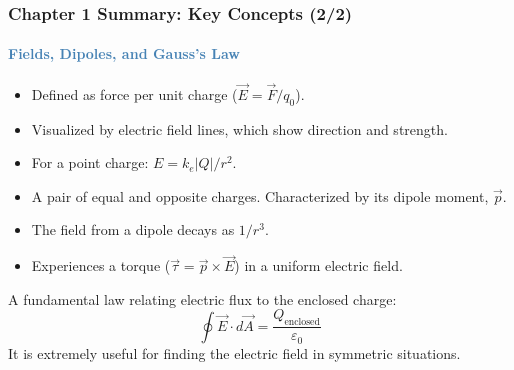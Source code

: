 \begin{frame}
\begin{frame}
\frametitle{\textsf{\textbf{Chapter 1 Summary:} Key Concepts (2/2)}}
\framesubtitle{\textcolor{steelblue}{Fields, Dipoles, and Gauss's Law}}

\begin{keybox}
\vspace{0.1cm}
\begin{itemize}
    \item Defined as force per unit charge ($\vec{E} = \vec{F}/q_0$).
    \item Visualized by electric field lines, which show direction and strength.
    \item For a point charge: $E = k_e |Q|/r^2$.
\end{itemize}
\vspace{0.1cm}
\end{keybox}

\vspace{0.3cm}

\begin{examplebox}
\vspace{0.1cm}
\begin{itemize}
    \item A pair of equal and opposite charges. Characterized by its dipole moment, $\vec{p}$.
    \item The field from a dipole decays as $1/r^3$.
    \item Experiences a torque ($\vec{\tau} = \vec{p} \times \vec{E}$) in a uniform electric field.
\end{itemize}
\vspace{0.1cm}
\end{examplebox}

\vspace{0.3cm}

\begin{formulabox}
\vspace{0.1cm}
A fundamental law relating electric flux to the enclosed charge:
\begin{equation*}
\oint \vec{E} \cdot d\vec{A} = \frac{Q_{\text{enclosed}}}{\varepsilon_0}
\end{equation*}
It is extremely useful for finding the electric field in symmetric situations.
\vspace{0.1cm}
\end{formulabox}


\end{frame}
\end{frame}
